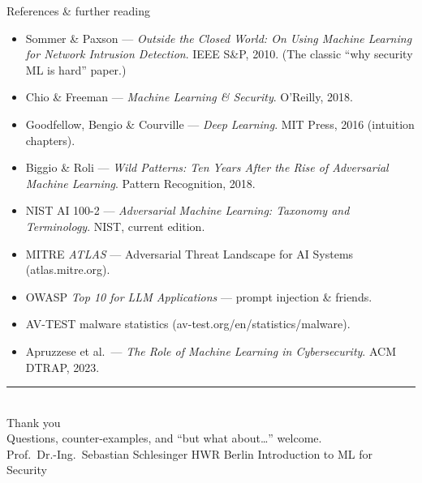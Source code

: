 \documentclass[aspectratio=169,10pt]{beamer}
\newcommand{\link}[1]{{\color{accent}\small#1}}
\begin{document}
\begin{frame}{References \& further reading}
  \footnotesize
  \begin{itemize}\setlength\itemsep{2pt}
    \item Sommer \& Paxson --- \emph{Outside the Closed World: On Using Machine
          Learning for Network Intrusion Detection}. IEEE S\&P, 2010.
          (The classic ``why security ML is hard'' paper.)
    \item Chio \& Freeman --- \emph{Machine Learning \& Security}. O'Reilly, 2018.
    \item Goodfellow, Bengio \& Courville --- \emph{Deep Learning}. MIT Press, 2016
          (intuition chapters).
    \item Biggio \& Roli --- \emph{Wild Patterns: Ten Years After the Rise of
          Adversarial Machine Learning}. Pattern Recognition, 2018.
    \item NIST AI 100-2 --- \emph{Adversarial Machine Learning: Taxonomy and
          Terminology}. NIST, current edition.
    \item MITRE \emph{ATLAS} --- Adversarial Threat Landscape for AI Systems
          (\link{atlas.mitre.org}).
    \item OWASP \emph{Top 10 for LLM Applications} --- prompt injection \& friends.
    \item AV-TEST malware statistics (\link{av-test.org/en/statistics/malware}).
    \item Apruzzese et al.\ --- \emph{The Role of Machine Learning in
          Cybersecurity}. ACM DTRAP, 2023.
  \end{itemize}
\end{frame}

\begin{frame}
  \vfill\centering
  {\color{mlsig}\rule{0.16\paperwidth}{2.2pt}}\\[0.8em]
  {\color{mlink}Thank you}\\[0.4em]
  {\color{midgray}\small Questions, counter-examples, and ``but what about\ldots'' welcome.}\\[1.0em]
  {\footnotesize\color{midgray}Prof.\ Dr.-Ing.\ Sebastian Schlesinger {\color{mlsig}\textbullet}
   HWR Berlin {\color{mlsig}\textbullet} Introduction to ML for Security}
  \vfill
\end{frame}
\end{document}
